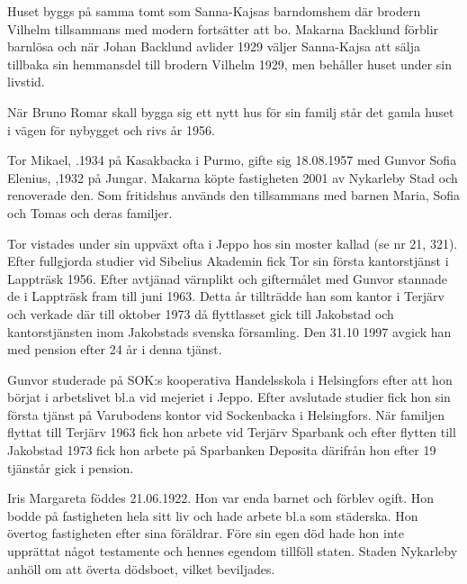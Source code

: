 Huset byggs på samma tomt som Sanna-Kajsas barndomshem där brodern Vilhelm tillsammans med modern fortsätter att bo. Makarna Backlund förblir barnlösa och när Johan Backlund avlider 1929 väljer Sanna-Kajsa att sälja tillbaka sin hemmansdel till brodern Vilhelm 1929, men behåller huset under sin livstid.

När Bruno Romar skall bygga sig ett nytt hus för sin familj står det gamla huset i vägen för nybygget och rivs år 1956.






Tor Mikael, .1934 på Kasakbacka i Purmo, gifte sig 18.08.1957 med Gunvor Sofia Elenius, ,1932 på Jungar. Makarna köpte fastigheten 2001 av Nykarleby Stad och renoverade den. Som fritidshus används den tillsammans med barnen Maria, Sofia och Tomas och deras familjer.

Tor vistades under sin uppväxt ofta i Jeppo hos sin moster  kallad (se nr 21, 321). Efter fullgjorda studier vid Sibelius Akademin fick Tor sin första kantorstjänst i Lappträsk 1956. Efter avtjänad värnplikt och giftermålet med Gunvor stannade de i Lappträsk fram till juni 1963. Detta år tillträdde han som kantor i Terjärv och verkade där till oktober 1973 då flyttlasset gick till Jakobstad och kantorstjänsten inom Jakobstads svenska församling. Den 31.10 1997 avgick han med pension efter 24 år i denna tjänst.

Gunvor studerade på SOK:s kooperativa Handelsskola i Helsingfors efter att hon börjat i arbetslivet bl.a vid mejeriet i Jeppo. Efter avslutade studier fick hon sin första tjänst på Varubodens kontor vid Sockenbacka i Helsingfors. När familjen flyttat till Terjärv 1963 fick hon arbete vid Terjärv Sparbank och efter flytten till Jakobstad 1973 fick hon arbete på Sparbanken Deposita därifrån hon efter 19 tjänstår gick i pension.


Iris Margareta föddes 21.06.1922. Hon var enda barnet och förblev ogift. Hon bodde på fastigheten hela sitt liv och hade arbete bl.a som städerska. Hon övertog fastigheten efter sina föräldrar. Före sin egen död hade hon inte upprättat något testamente och hennes egendom tillföll staten. Staden Nykarleby anhöll om att överta dödsboet, vilket beviljades.

